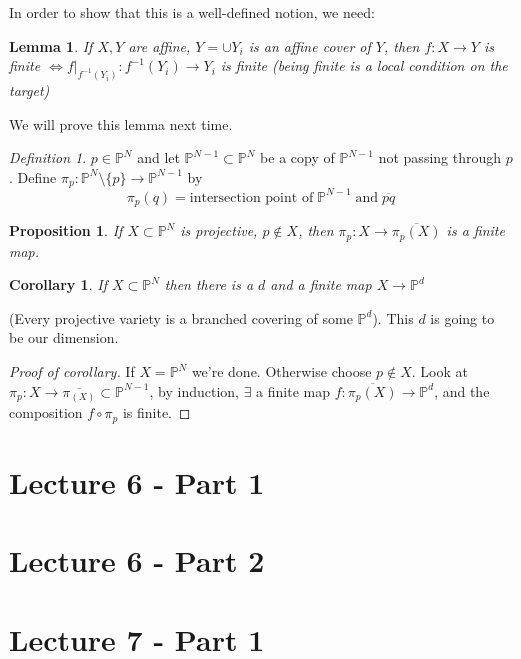\documentclass[12pt]{article}
\newtheorem{lemma}[theorem]{Lemma}
\newtheorem{proposition}[theorem]{Proposition}
\newtheorem{corollary}[theorem]{Corollary}
\theoremstyle{remark}
\newtheorem{definition}[theorem]{Definition}
\newcommand{\Pp}{\mathbb{P}}
\begin{document}
In order to show that this is a well-defined notion, we need:

\begin{lemma}
If $X,Y$ are affine, $Y = \cup Y_i$ is an affine cover of $Y$, then $f: X \rightarrow Y$ is finite $\iff f|_{f^{-1}(Y_i)}: f^{-1}(Y_i) \rightarrow Y_i$ is finite (being finite is a local condition on the target)

\end{lemma}

We will prove this lemma next time.\\

\begin{definition}
$p \in \Pp^N$ and let $\Pp^{N-1} \subset \Pp^N$ be a copy of $\Pp^{N-1}$ not passing through $p$. Define $\pi_p: \Pp^N \setminus \{ p \} \rightarrow \Pp^{N-1}$ by
$$\pi_p(q) = \text{intersection point of} \; \Pp^{N-1} \; \text{and} \; \overline{pq} $$
\end{definition}

\begin{proposition}
If $X \subset \Pp^{N}$ is projective, $p \not \in X$, then $\pi_p : X \rightarrow \overline{\pi_p(X)}$ is a finite map.
\end{proposition}

\begin{corollary}
If $X \subset \Pp^N$ then there is a $d$ and a finite map $X \rightarrow \Pp^d$
\end{corollary}

(Every projective variety is a branched covering of some $\Pp^d$). This $d$ is going to be our dimension.

\begin{proof}[Proof of corollary]
If $X = \Pp^N$ we're done. Otherwise choose $p \not \in X$. Look at $\pi_p : X \rightarrow \overline{\pi_(X)} \subset \Pp^{N-1}$, by induction, $\exists$ a finite map $f: \overline{\pi_p(X)} \rightarrow \Pp^d$, and the composition $f \circ \pi_p$ is finite.
\end{proof}

\section{Lecture 6 - Part 1}

\section{Lecture 6 - Part 2}


\section{Lecture 7 - Part 1}
\end{document}
